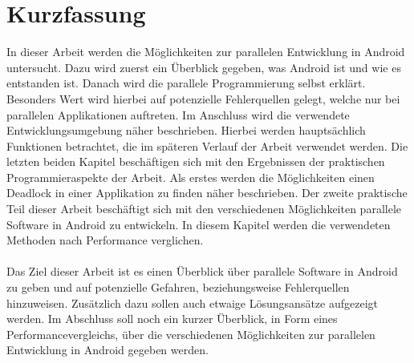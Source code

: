 \chapter[Kurzfassung] {Kurzfassung}       
\label{cha:kurzfassung}

In dieser Arbeit werden die Möglichkeiten zur parallelen Entwicklung in Android untersucht. Dazu wird zuerst ein Überblick gegeben, was Android ist und wie es entstanden ist. Danach wird die parallele Programmierung selbst erklärt. Besonders Wert wird hierbei auf potenzielle Fehlerquellen gelegt, welche nur bei parallelen Applikationen auftreten. Im Anschluss wird die verwendete Entwicklungsumgebung näher beschrieben. Hierbei werden hauptsächlich Funktionen betrachtet, die im späteren Verlauf der Arbeit verwendet werden. Die letzten beiden Kapitel beschäftigen sich mit den Ergebnissen der praktischen Programmieraspekte der Arbeit. Als erstes werden die Möglichkeiten einen Deadlock in einer Applikation zu finden näher beschrieben. Der zweite praktische Teil dieser Arbeit beschäftigt sich mit den verschiedenen Möglichkeiten parallele Software in Android zu entwickeln. In diesem Kapitel werden die verwendeten Methoden nach Performance verglichen.
\\
\\
Das Ziel dieser Arbeit ist es einen Überblick über parallele Software in Android zu geben und auf potenzielle Gefahren, beziehungsweise Fehlerquellen hinzuweisen. Zusätzlich dazu sollen auch etwaige Lösungsansätze aufgezeigt werden. Im Abschluss soll noch ein kurzer Überblick, in Form eines Performancevergleichs, über die verschiedenen Möglichkeiten zur parallelen Entwicklung in Android gegeben werden.